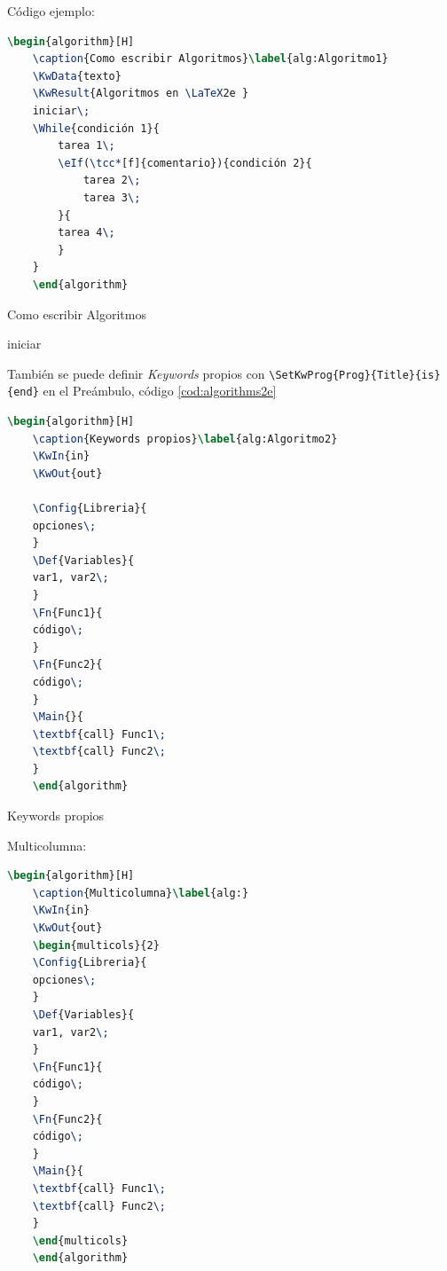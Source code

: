 Código ejemplo:
\begin{lstlisting}[language=tex, caption={}, label={}]
	\begin{algorithm}[H]
	\caption{Como escribir Algoritmos}\label{alg:Algoritmo1}
	\KwData{texto}
	\KwResult{Algoritmos en \LaTeX2e }
	iniciar\;
	\While{condición 1}{
		tarea 1\;
		\eIf(\tcc*[f]{comentario}){condición 2}{
			tarea 2\;
			tarea 3\;
		}{
		tarea 4\;
		}
	}
	\end{algorithm}
\end{lstlisting}

\begin{algorithm}[H]
	\caption{Como escribir Algoritmos}\label{alg:Algoritmo1}
	iniciar\;
\end{algorithm}


También se puede definir \textit{Keywords} propios con \verb|\SetKwProg{Prog}{Title}{is}{end}| en el Preámbulo, código \ref{cod:algorithms2e}
\begin{lstlisting}[language=tex, caption={}, label={}]
	\begin{algorithm}[H]
	\caption{Keywords propios}\label{alg:Algoritmo2}	
	\KwIn{in}
	\KwOut{out}
	
	\Config{Libreria}{
	opciones\;
	}
	\Def{Variables}{
	var1, var2\;			
	}
	\Fn{Func1}{
	código\;
	}
	\Fn{Func2}{
	código\;
	}	
	\Main{}{
	\textbf{call} Func1\;
	\textbf{call} Func2\;	
	}
	\end{algorithm}
\end{lstlisting}


\begin{algorithm}[H]
	\caption{Keywords propios}\label{alg:Algoritmo2}	
	
\end{algorithm}

Multicolumna:
\begin{lstlisting}[language=tex, caption={}, label={}]
	\begin{algorithm}[H]
	\caption{Multicolumna}\label{alg:}	
	\KwIn{in}
	\KwOut{out}
	\begin{multicols}{2}
	\Config{Libreria}{
	opciones\;
	}
	\Def{Variables}{
	var1, var2\;			
	}
	\Fn{Func1}{
	código\;
	}
	\Fn{Func2}{
	código\;
	}	
	\Main{}{
	\textbf{call} Func1\;
	\textbf{call} Func2\;	
	}
	\end{multicols}	
	\end{algorithm}
\end{lstlisting}

